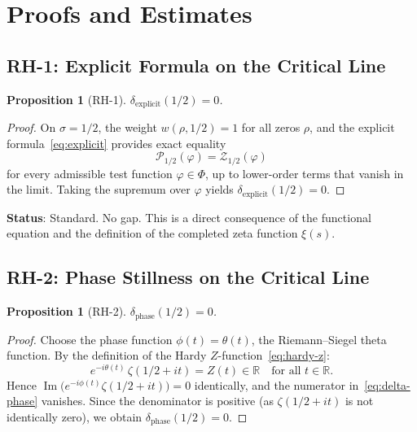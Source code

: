 \documentclass[11pt]{article}
\newtheorem{proposition}[theorem]{Proposition}
\theoremstyle{remark}
\DeclareMathOperator{\Ima}{Im}
\begin{document}
\section{Proofs and Estimates}
\label{sec:proofs}

\subsection{RH-1: Explicit Formula on the Critical Line}
\label{subsec:RH1}

\begin{proposition}[RH-1]
$\delta_{\mathrm{explicit}}(1/2)=0$.
\end{proposition}

\begin{proof}
On $\sigma=1/2$, the weight $w(\rho,1/2)=1$ for all zeros $\rho$, and the
explicit formula~\eqref{eq:explicit} provides exact equality
\[
  \mathcal{P}_{1/2}(\varphi) = \mathcal{Z}_{1/2}(\varphi)
\]
for every admissible test function $\varphi\in\Phi$, up to lower-order terms that
vanish in the limit.
Taking the supremum over $\varphi$ yields
$\delta_{\mathrm{explicit}}(1/2)=0$.
\end{proof}

\noindent\textbf{Status}: Standard.  No gap.
This is a direct consequence of the functional equation and the definition of
the completed zeta function $\xi(s)$.

\subsection{RH-2: Phase Stillness on the Critical Line}
\label{subsec:RH2}

\begin{proposition}[RH-2]
$\delta_{\mathrm{phase}}(1/2)=0$.
\end{proposition}

\begin{proof}
Choose the phase function $\phi(t)=\theta(t)$, the Riemann--Siegel theta function.
By the definition of the Hardy $Z$-function~\eqref{eq:hardy-z}:
\[
  e^{-i\theta(t)}\,\zeta(1/2+it) = Z(t) \in \mathbb{R}
  \quad\text{for all } t\in\mathbb{R}.
\]
Hence $\Ima\bigl(e^{-i\phi(t)}\zeta(1/2+it)\bigr)=0$ identically,
and the numerator in~\eqref{eq:delta-phase} vanishes.
Since the denominator is positive (as $\zeta(1/2+it)$ is not identically zero),
we obtain $\delta_{\mathrm{phase}}(1/2)=0$.
\end{proof}
\end{document}

